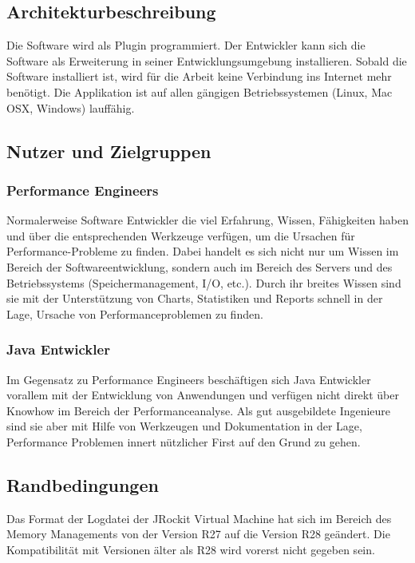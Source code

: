 \subsection{Architekturbeschreibung}
Die Software wird als Plugin programmiert. Der Entwickler kann sich die Software als Erweiterung in seiner Entwicklungsumgebung installieren. Sobald die Software installiert ist, wird für die Arbeit keine Verbindung ins Internet mehr benötigt. Die Applikation ist auf allen gängigen Betriebssystemen (Linux, Mac OSX, Windows) lauffähig.

\subsection{Nutzer und Zielgruppen}
\subsubsection{Performance Engineers}
Normalerweise Software Entwickler die viel Erfahrung, Wissen, Fähigkeiten haben und über die entsprechenden Werkzeuge verfügen, um die Ursachen für Performance-Probleme zu finden. Dabei handelt es sich nicht nur um Wissen im Bereich der Softwareentwicklung, sondern auch im Bereich des Servers und des Betriebssystems (Speichermanagement, I/O, etc.). Durch ihr breites Wissen sind sie mit der Unterstützung von Charts, Statistiken und Reports schnell in der Lage, Ursache von Performanceproblemen zu finden.

\subsubsection{Java Entwickler}
Im Gegensatz zu Performance Engineers beschäftigen sich Java Entwickler vorallem mit der Entwicklung von Anwendungen und verfügen nicht direkt über Knowhow im Bereich der Performanceanalyse. Als gut ausgebildete Ingenieure sind sie aber mit Hilfe von Werkzeugen und Dokumentation in der Lage, Performance Problemen innert nützlicher First auf den Grund zu gehen.

\subsection{Randbedingungen}\label{randbedingungen}
Das Format der Logdatei der JRockit Virtual Machine hat sich im Bereich des Memory Managements von der Version R27 auf die Version R28 geändert. Die Kompatibilität mit Versionen älter als R28 wird vorerst nicht gegeben sein.




